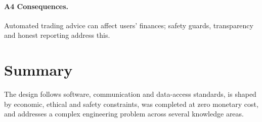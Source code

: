 \paragraph{A4 Consequences.} Automated trading advice can affect users' finances; safety guards, transparency and honest reporting address this.

\section{Summary}
The design follows software, communication and data-access standards, is shaped by economic, ethical and safety constraints, was completed at zero monetary cost, and addresses a complex engineering problem across several knowledge areas.
